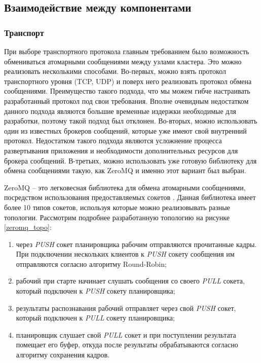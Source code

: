 
\subsection{Взаимодействие между компонентами}

\subsubsection{Транспорт}

При выборе транспортного протокола главным требованием было возможность обмениваться атомарными сообщениями между узлами
кластера. Это можно реализовать несколькими способами. Во-первых, можно взять протокол транспортного уровня (TCP, UDP)
и поверх него реализовать протокол обмена сообщениями. Преимущество такого подхода, что мы можем гибче настраивать разработанный
протокол под свои требования. Вполне очевидным недостатком данного подхода являются большие временные издержки необходимые 
для разработки, поэтому такой подход был отклонен. Во-вторых, можно использовать один из известных брокеров сообщений, 
которые уже имеют свой внутренний протокол. Недостатком такого подхода являются усложнение процесса развертывания 
приложения и необходимости дополнительных ресурсов для брокера сообщений. В-третьих, можно использовать уже готовую 
библиотеку для обмена сообщениями такую, как ZeroMQ и именно этот вариант был выбран.

ZeroMQ -- это легковесная библиотека для обмена атомарными сообщениями, посредством использования предоставляемых сокетов 
\cite{ZEROMQ}. Данная библиотека имеет более 10 типов сокетов, используя которые можно реализовывать разные топологии.
Рассмотрим подробнее разработанную топологию на рисунке \ref{zeromq_topo}:


\begin{enumerate}
\item через \emph{PUSH} сокет планировщика рабочим отправляются прочитанные кадры. При подключении нескольких клиентов к 
\emph{PUSH} сокету сообщения им отправляются согласно алгоритму Round-Robin;
\item рабочий при старте начинает слушать сообщения со своего \emph{PULL} сокета, который подключен к \emph{PUSH} сокету 
планировщика;
\item результаты распознавания рабочий отправляет через свой \emph{PUSH} сокет, который подключен к \emph{PULL} сокету 
планировщика;
\item планировщик слушает свой \emph{PULL} сокет и при поступлении результата помещает его буфер, откуда после результаты
обрабатываются согласно алгоритму сохранения кадров.
\end{enumerate}

